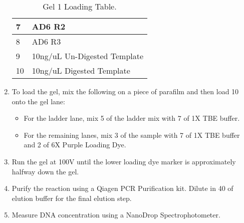 \documentclass{ssiBio}
\begin{document}
\begin{enumerate}
\begin{table}[ht]
\begin{tabular}{|l|l|}
    7 & AD6 R2 \\ \hline
    8 & AD6 R3 \\ \hline
    9 & 10ng/uL Un-Digested Template \\ \hline
    10 & 10ng/uL Digested Template \\ \hline
    \end{tabular}
    \caption{\label{tab:gel-1-table}Gel 1 Loading Table.}
    \end{table}
  \item{To load the gel, mix the following on a piece of parafilm and then load 10\uL{} onto the gel lane:}
  \begin{itemize}
    \item{For the ladder lane, mix 5\uL{} of the ladder mix with 7\uL{} of 1X TBE buffer.}
    \item{For the remaining lanes, mix 3\uL{} of the sample with 7\uL{} of 1X TBE buffer and 2\uL{} of 6X Purple Loading Dye.}
  \end{itemize}
  \item{Run the gel at 100V until the lower loading dye marker is approximately halfway down the gel.}
  \stopPoint{}
  \item{Purify the reaction using a Qiagen PCR Purification kit. Dilute in 40 \uL{} of elution buffer for the final elution step.}
  \item{Measure DNA concentration using a NanoDrop Spectrophotometer.}
  \stopPoint{}
\end{enumerate}
\end{document}
